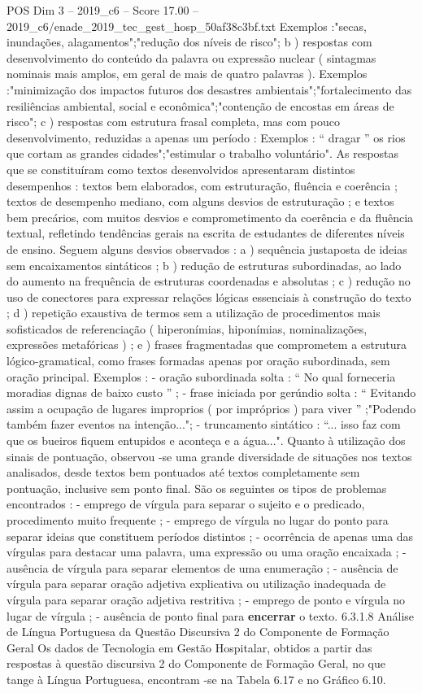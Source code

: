 \begin{textsample}{POS Dim 3 – 2019\_c6 – Score 17.00 – 2019\_c6/enade\_2019\_tec\_gest\_hosp\_50af38c3bf.txt}
Exemplos :"secas, inundações, alagamentos";"redução dos níveis de risco"; b ) respostas com desenvolvimento do conteúdo da palavra ou expressão nuclear ( sintagmas nominais mais amplos, em geral de mais de quatro palavras ).
Exemplos :"minimização dos impactos futuros dos desastres ambientais";"fortalecimento das resiliências ambiental, social e econômica";"contenção de encostas em áreas de risco"; c ) respostas com estrutura frasal completa, mas com pouco desenvolvimento, reduzidas a apenas um período : Exemplos : “ dragar ” os rios que cortam as grandes cidades";"estimular o trabalho voluntário".
As respostas que se constituíram como textos desenvolvidos apresentaram distintos desempenhos : textos bem elaborados, com estruturação, fluência e coerência ; textos de desempenho mediano, com alguns desvios de estruturação ; e textos bem precários, com muitos desvios e comprometimento da coerência e da fluência textual, refletindo tendências gerais na escrita de estudantes de diferentes níveis de ensino.
Seguem alguns desvios observados : a ) sequência justaposta de ideias sem encaixamentos sintáticos ; b ) redução de estruturas subordinadas, ao lado do aumento na frequência de estruturas coordenadas e absolutas ; c ) redução no uso de conectores para expressar relações lógicas essenciais à construção do texto ; d ) repetição exaustiva de termos sem a utilização de procedimentos mais sofisticados de referenciação ( hiperonímias, hiponímias, nominalizações, expressões metafóricas ) ; e ) frases fragmentadas que comprometem a estrutura lógico-gramatical, como frases formadas apenas por oração subordinada, sem oração principal.
Exemplos : - oração subordinada solta : “ No qual forneceria moradias dignas de baixo custo ” ; - frase iniciada por gerúndio solta : “ Evitando assim a ocupação de lugares improprios ( por impróprios ) para viver ” ;"Podendo também fazer eventos na intenção..."; - truncamento sintático : “... isso faz com que os bueiros fiquem entupidos e aconteça e a água...".
Quanto à utilização dos sinais de pontuação, observou -se uma grande diversidade de situações nos textos analisados, desde textos bem pontuados até textos completamente sem pontuação, inclusive sem ponto final.
São os seguintes os tipos de problemas encontrados : - emprego de vírgula para separar o sujeito e o predicado, procedimento muito frequente ; - emprego de vírgula no lugar do ponto para separar ideias que constituem períodos distintos ; - ocorrência de apenas uma das vírgulas para destacar uma palavra, uma expressão ou uma oração encaixada ; - ausência de vírgula para separar elementos de uma enumeração ; - ausência de vírgula para separar oração adjetiva explicativa ou utilização inadequada de vírgula para separar oração adjetiva restritiva ; - emprego de ponto e vírgula no lugar de vírgula ; - ausência de ponto final para \textbf{encerrar} o texto. 6.3.1.8 Análise de Língua Portuguesa da Questão Discursiva 2 do Componente de Formação Geral Os dados de Tecnologia em Gestão Hospitalar, obtidos a partir das respostas à questão discursiva 2 do Componente de Formação Geral, no que tange à Língua Portuguesa, encontram -se na Tabela 6.17 e no Gráfico 6.10.

\end{textsample}
